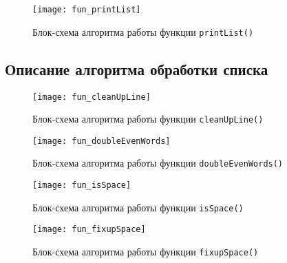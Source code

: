 \begin{figure}[H]
  \centering
  \texttt{[image: fun\_printList]}
  \caption{Блок-схема алгоритма работы функции \texttt{printList()}}
\end{figure}

\subsection{Описание алгоритма обработки списка}
\begin{figure}[H]
  \centering
  \texttt{[image: fun\_cleanUpLine]}
  \caption{Блок-схема алгоритма работы функции \texttt{cleanUpLine()}}
\end{figure}

\begin{figure}[H]
  \centering
  \texttt{[image: fun\_doubleEvenWords]}
  \caption{Блок-схема алгоритма работы функции \texttt{doubleEvenWords()}}
\end{figure}

\begin{figure}[H]
  \centering
  \texttt{[image: fun\_isSpace]}
  \caption{Блок-схема алгоритма работы функции \texttt{isSpace()}}
\end{figure}

\begin{figure}[H]
  \centering
  \texttt{[image: fun\_fixupSpace]}
  \caption{Блок-схема алгоритма работы функции \texttt{fixupSpace()}}
\end{figure}
